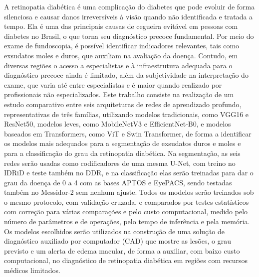 A retinopatia diabética é uma complicação do diabetes que pode evoluir de forma silenciosa e causar danos irreversíveis à visão quando não identificada e tratada a tempo. Ela é uma das principais causas de cegueira evitável em pessoas com diabetes no Brasil, o que torna seu diagnóstico precoce fundamental. Por meio do exame de fundoscopia, é possível identificar indicadores relevantes, tais como exsudatos moles e duros, que auxiliam na avaliação da doença. Contudo, em diversas regiões o acesso a especialistas e à infraestrutura adequada para o diagnóstico precoce ainda é limitado, além da subjetividade na interpretação do exame, que varia até entre especialistas e é maior quando realizado por profissionais não especializados. Este trabalho consiste na realização de um estudo comparativo entre seis arquiteturas de redes de aprendizado profundo, representativas de três famílias, utilizando modelos tradicionais, como VGG16 e ResNet50, modelos leves, como MobileNetV3 e EfficientNet-B0, e modelos baseados em Transformers, como ViT e Swin Transformer, de forma a identificar os modelos mais adequados para a segmentação de exsudatos duros e moles e para a classificação do grau da retinopatia diabética. Na segmentação, as seis redes serão usadas como codificadores de uma mesma U-Net, com treino no IDRiD e teste também no DDR, e na classificação elas serão treinadas para dar o grau da doença de 0 a 4 com as bases APTOS e EyePACS, sendo testadas também no Messidor-2 sem nenhum ajuste. Todos os modelos serão treinados sob o mesmo protocolo, com validação cruzada, e comparados por testes estatísticos com correção para várias comparações e pelo custo computacional, medido pelo número de parâmetros e de operações, pelo tempo de inferência e pela memória. Os modelos escolhidos serão utilizados na construção de uma solução de diagnóstico auxiliado por computador (CAD) que mostre as lesões, o grau previsto e um alerta de edema macular, de forma a auxiliar, com baixo custo computacional, no diagnóstico de retinopatia diabética em regiões com recursos médicos limitados.

